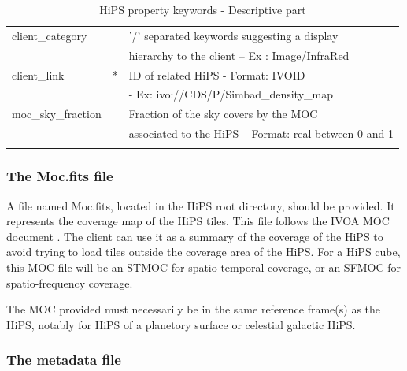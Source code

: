 \documentclass[11pt,a4paper]{ivoa}
\begin{document}
\begin{longtable}{|l|c|l|}
client\_category &   & '/' separated keywords suggesting a display \\ & & hierarchy to the client – Ex : Image/InfraRed \\ \hline
client\_link & *  & ID of related HiPS  - Format: IVOID\\ & & - Ex: ivo://CDS/P/Simbad\_density\_map \\ \hline
moc\_sky\_fraction &   & Fraction of the sky covers by the MOC\\ & & associated to the HiPS – Format: real between 0 and 1 \\ \hline

\caption{HiPS property keywords - Descriptive part}
\label{tab:keywords1}
\end{longtable}



\subsubsection{The Moc.fits file}

A file named Moc.fits, located in the HiPS root directory, should be provided. It represents the coverage map of the HiPS tiles. This file follows the IVOA MOC document \citep{MOC2.1}. The client can use it as a summary of the coverage of the HiPS to avoid trying to load tiles outside the coverage area of the HiPS.
For a HiPS cube, this MOC file will be an STMOC for spatio-temporal coverage, or an SFMOC for spatio-frequency coverage.

The MOC provided must necessarily be in the same reference frame(s) as the HiPS, notably for HiPS of a planetory surface or celestial galactic HiPS.

\subsubsection{The metadata file}
\end{document}
